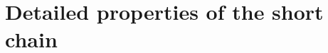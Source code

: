 \documentclass[10pt]{article}
\begin{document}
\section{Detailed properties of the short chain}
\label{sec:short-chain-density}

\end{document}
